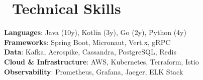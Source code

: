 \documentclass[letterpaper,11pt]{article}
\begin{document}
\section{\faCode\ Technical Skills}
 \begin{itemize}[leftmargin=0.15in, label={}]
    \small{\item{
      \textbf{Languages}: Java (10y), Kotlin (3y), Go (2y), Python (4y) \\
      \textbf{Frameworks}: Spring Boot, Micronaut, Vert.x, gRPC \\
      \textbf{Data}: Kafka, Aerospike, Cassandra, PostgreSQL, Redis \\
      \textbf{Cloud \& Infrastructure}: AWS, Kubernetes, Terraform, Istio \\
      \textbf{Observability}: Prometheus, Grafana, Jaeger, ELK Stack \\
    }}
 \end{itemize}
\end{document}
